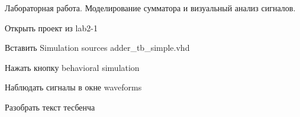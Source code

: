 Лабораторная работа. Моделирование сумматора и визуальный анализ сигналов.

Открыть проект из lab2-1

Вставить Simulation sources adder\_tb\_simple.vhd

Нажать кнопку behavioral simulation

Наблюдать сигналы в окне waveforms

Разобрать текст тесбенча



